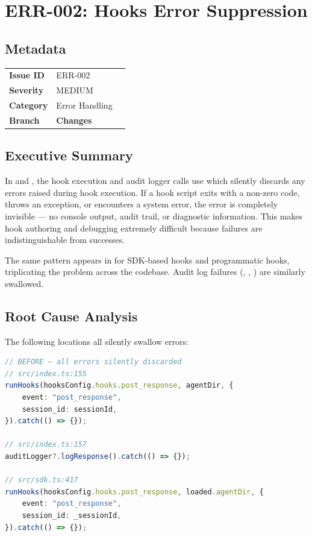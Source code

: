 \section{ERR-002: Hooks Error Suppression}
\label{sec:err-002}
\subsection*{Metadata}
\begin{tabular}{ll}
\textbf{Issue ID} & ERR-002 \\
\textbf{Severity} & MEDIUM \\
\textbf{Category} & Error Handling \\
\textbf{Branch} & 
\textbf{Changes} &  \\
\end{tabular}

\subsection*{Executive Summary}
In  and , the  hook execution and audit logger calls use  which silently discards any errors raised during hook execution. If a hook script exits with a non-zero code, throws an exception, or encounters a system error, the error is completely invisible — no console output, audit trail, or diagnostic information. This makes hook authoring and debugging extremely difficult because failures are indistinguishable from successes.

The same pattern appears in  for SDK-based  hooks and programmatic  hooks, triplicating the problem across the codebase. Audit log failures (, , ) are similarly swallowed.

\subsection*{Root Cause Analysis}
The following locations all silently swallow errors:

\begin{lstlisting}[language=TypeScript]
// BEFORE — all errors silently discarded
// src/index.ts:155
runHooks(hooksConfig.hooks.post_response, agentDir, {
    event: "post_response",
    session_id: sessionId,
}).catch(() => {});

// src/index.ts:157
auditLogger?.logResponse().catch(() => {});

// src/sdk.ts:417
runHooks(hooksConfig.hooks.post_response, loaded.agentDir, {
    event: "post_response",
    session_id: _sessionId,
}).catch(() => {});
\end{lstlisting}

